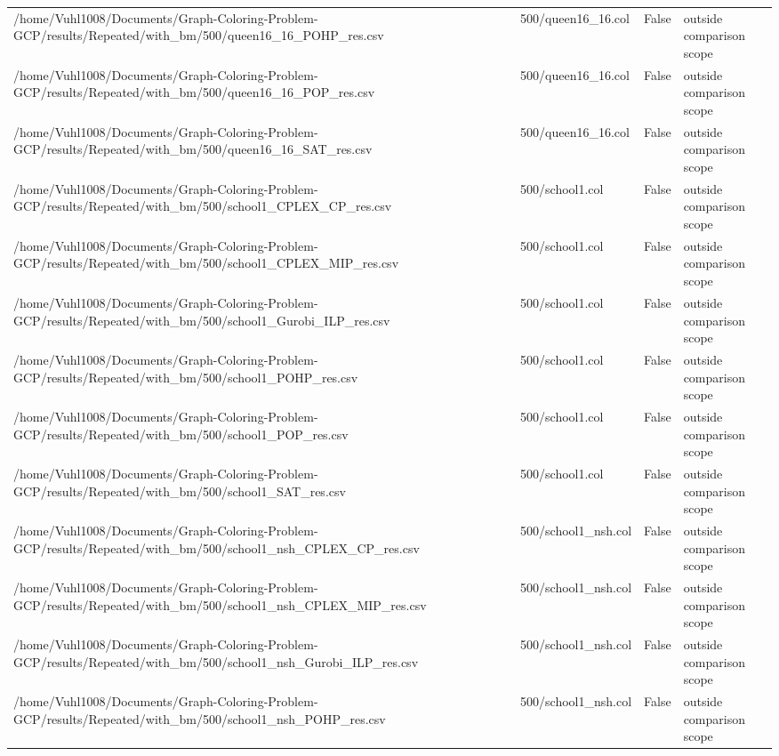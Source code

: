 \begin{table}[htbp]
\begin{tabular}{llll}
/home/Vuhl1008/Documents/Graph-Coloring-Problem-GCP/results/Repeated/with\_bm/500/queen16\_16\_POHP\_res.csv & 500/queen16\_16.col & False & outside comparison scope \\
/home/Vuhl1008/Documents/Graph-Coloring-Problem-GCP/results/Repeated/with\_bm/500/queen16\_16\_POP\_res.csv & 500/queen16\_16.col & False & outside comparison scope \\
/home/Vuhl1008/Documents/Graph-Coloring-Problem-GCP/results/Repeated/with\_bm/500/queen16\_16\_SAT\_res.csv & 500/queen16\_16.col & False & outside comparison scope \\
/home/Vuhl1008/Documents/Graph-Coloring-Problem-GCP/results/Repeated/with\_bm/500/school1\_CPLEX\_CP\_res.csv & 500/school1.col & False & outside comparison scope \\
/home/Vuhl1008/Documents/Graph-Coloring-Problem-GCP/results/Repeated/with\_bm/500/school1\_CPLEX\_MIP\_res.csv & 500/school1.col & False & outside comparison scope \\
/home/Vuhl1008/Documents/Graph-Coloring-Problem-GCP/results/Repeated/with\_bm/500/school1\_Gurobi\_ILP\_res.csv & 500/school1.col & False & outside comparison scope \\
/home/Vuhl1008/Documents/Graph-Coloring-Problem-GCP/results/Repeated/with\_bm/500/school1\_POHP\_res.csv & 500/school1.col & False & outside comparison scope \\
/home/Vuhl1008/Documents/Graph-Coloring-Problem-GCP/results/Repeated/with\_bm/500/school1\_POP\_res.csv & 500/school1.col & False & outside comparison scope \\
/home/Vuhl1008/Documents/Graph-Coloring-Problem-GCP/results/Repeated/with\_bm/500/school1\_SAT\_res.csv & 500/school1.col & False & outside comparison scope \\
/home/Vuhl1008/Documents/Graph-Coloring-Problem-GCP/results/Repeated/with\_bm/500/school1\_nsh\_CPLEX\_CP\_res.csv & 500/school1\_nsh.col & False & outside comparison scope \\
/home/Vuhl1008/Documents/Graph-Coloring-Problem-GCP/results/Repeated/with\_bm/500/school1\_nsh\_CPLEX\_MIP\_res.csv & 500/school1\_nsh.col & False & outside comparison scope \\
/home/Vuhl1008/Documents/Graph-Coloring-Problem-GCP/results/Repeated/with\_bm/500/school1\_nsh\_Gurobi\_ILP\_res.csv & 500/school1\_nsh.col & False & outside comparison scope \\
/home/Vuhl1008/Documents/Graph-Coloring-Problem-GCP/results/Repeated/with\_bm/500/school1\_nsh\_POHP\_res.csv & 500/school1\_nsh.col & False & outside comparison scope \\

\end{tabular}
\end{table}
